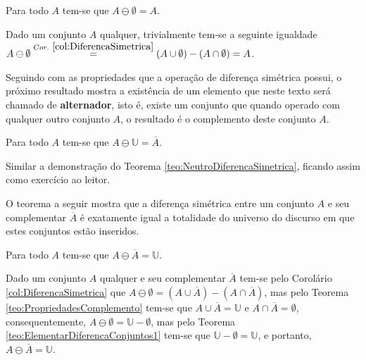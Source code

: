 \begin{teorema}\label{teo:NeutroDiferencaSimetrica}
	Para todo $A$ tem-se que $A \ominus \emptyset = A$.
\end{teorema}

\begin{prova}
	Dado um conjunto $A$ qualquer, trivialmente tem-se a seguinte igualdade $A \ominus \emptyset \stackrel{Cor. \ \ref{col:DiferencaSimetrica}}{=} (A \cup \emptyset) - (A \cap \emptyset) = A$.
\end{prova}

Seguindo com as propriedades que a operação de diferença simétrica possui, o próximo resultado mostra a existência de um elemento que neste texto será chamado de \textbf{alternador}, isto é, existe um conjunto que quando operado com qualquer outro conjunto $A$, o resultado é o complemento deste conjunto $A$.

\begin{teorema}\label{teo:InversorDiferencaSimetrica}
	Para todo $A$ tem-se que $A \ominus \mathbb{U} = \overline{A}$.
\end{teorema}

\begin{prova}
	Similar a demonstração do Teorema \ref{teo:NeutroDiferencaSimetrica}, ficando assim como exercício ao leitor.
\end{prova}

O teorema a seguir mostra que a diferença simétrica entre um conjunto $A$ e seu complementar $\overline{A}$ é exatamente igual a totalidade do universo do discurso em que estes conjuntos estão inseridos.

\begin{teorema}
  Para todo $A$ tem-se que $A \ominus \overline{A} = \mathbb{U}$.
\end{teorema}

\begin{prova}
	Dado um conjunto $A$ qualquer e seu complementar $\overline{A}$ tem-se pelo Corolário \ref{col:DiferencaSimetrica}  que 	$A \ominus \emptyset = (A \cup \overline{A}) - (A \cap \overline{A})$, mas pelo Teorema \ref{teo:PropriedadesComplemento} tem-se que $A \cup \overline{A} = \mathbb{U}$ e $A \cap \overline{A} = \emptyset$, consequentemente,  $A \ominus \emptyset = \mathbb{U} -  \emptyset$, mas pelo Teorema \ref{teo:ElementarDiferencaConjuntos1} tem-se que $\mathbb{U} -  \emptyset = \mathbb{U}$, e portanto, $A \ominus \overline{A} = \mathbb{U}$.
\end{prova}

